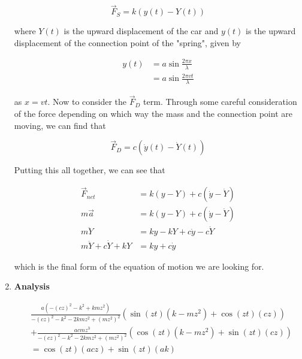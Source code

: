 \documentclass[12pt]{article}
\begin{document}
\begin{enumerate}
        \begin{equation}
            \vec{F}_S = k(y(t) - Y(t))
        \end{equation}

        \noindent
        where $Y(t)$ is the upward displacement of the car and $y(t)$ is the upward displacement 
        of the connection point of the "spring", given by 

        \begin{equation}
            \begin{split}
                y(t) &= a\sin\frac{2\pi x}{\lambda} \\
                &= a\sin\frac{2\pi v t}{\lambda}
            \end{split}
        \end{equation}

        \noindent
        as $x = vt$. Now to consider the $\vec{F}_D$ term. Through some careful consideration 
        of the force depending on which way the mass and the connection point are moving, we 
        can find that 

        \begin{equation}
            \vec{F}_D = c(\dot{y}(t) - \dot{Y}(t))
        \end{equation}

        \noindent
        Putting this all together, we can see that 

        \begin{equation}
            \begin{split}
                \vec{F}_{net} &= k(y - Y) + c(\dot{y} - \dot{Y}) \\
                m\vec{a} &= k(y - Y) + c(\dot{y} - \dot{Y}) \\
                m\ddot{Y} &= ky - kY + c\dot{y} - c\dot{Y} \\
                m\ddot{Y} + c\dot{Y} + kY &= ky + c\dot{y}
            \end{split}
        \end{equation}

        \noindent
        which is the final form of the equation of motion we are looking for.

        \item \textbf{Analysis} \newline
        
        \begin{equation}
            \begin{aligned}
                &\frac{a(-(cz)^2-k^2+kmz^2)}{-(cz)^2-k^2-2kmz^2+(mz^2)^2} (\sin(zt)(k-mz^2)+\cos(zt)(cz)) \\
                &+ \frac{acmz^3}{-(cz)^2-k^2-2kmz^2+(mz^2)^2} (\cos(zt)(k-mz^2)+\sin(zt)(cz)) \\
                &= \cos(zt)(acz) + \sin(zt)(ak)
            \end{aligned}
        \end{equation}
        
        
    \end{enumerate}
\end{document}

